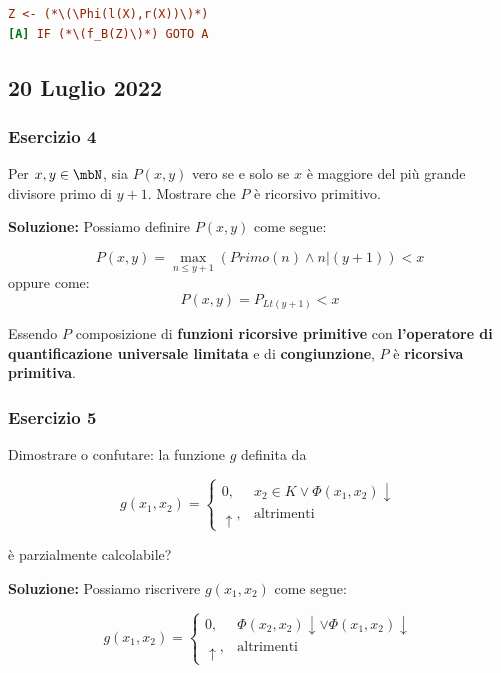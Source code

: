 \begin{lstlisting}[language=ini, caption={ }]
    Z <- (*\(\Phi(l(X),r(X))\)*)
[A] IF (*\(f_B(Z)\)*) GOTO A
\end{lstlisting}

\subsection{20 Luglio 2022}

\subsubsection{Esercizio 4}

Per \(x,y \in \mbN\), sia \(P(x,y)\) vero se e solo se \(x\) è maggiore del più grande divisore primo di \(y+1\). Mostrare che \(P\) è ricorsivo primitivo.

\textbf{Soluzione: } Possiamo definire \(P(x,y)\) come segue:

\begin{equation}
  P(x,y) = \max_{n \leq y+1} (Primo(n) \land n \vert (y+1)) < x
\end{equation}
oppure come:
\begin{equation}
  P(x,y) = P_{Lt(y+1)}< x
\end{equation}

Essendo \(P\) composizione di \textbf{funzioni ricorsive primitive} con \textbf{l'operatore di quantificazione universale limitata} e di \textbf{congiunzione}, \(P\) è \textbf{ricorsiva primitiva}.

\subsubsection{Esercizio 5}

Dimostrare o confutare: la funzione \(g\) definita da

\begin{equation}
  g(x_1,x_2) = \begin{cases}
    0, &x_2 \in K \lor \Phi(x_1, x_2) \downarrow\\
    \uparrow, &\text{altrimenti}
  \end{cases}
\end{equation}

è parzialmente calcolabile?

\textbf{Soluzione: } Possiamo riscrivere \(g(x_1,x_2)\) come segue:

\begin{equation}
  g(x_1,x_2) = \begin{cases}
    0, &\Phi(x_2,x_2) \downarrow \lor \Phi(x_1, x_2) \downarrow\\
    \uparrow, &\text{altrimenti}
  \end{cases}
\end{equation}

